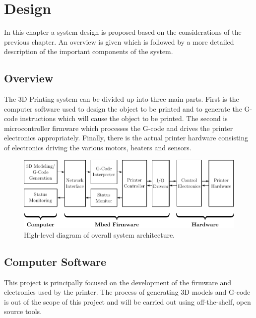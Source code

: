 \chapter{Design}
	
	
	In this chapter a system design is proposed based on the considerations of the
	previous chapter. An overview is given which is followed by a more detailed
	description of the important components of the system.
	
	\section{Overview}
		
		The 3D Printing system can be divided up into three main parts. First is the
		computer software used to design the object to be printed and to generate
		the G-code instructions which will cause the object to be printed. The
		second is microcontroller firmware which processes the G-code and drives the
		printer electronics appropriately. Finally, there is the actual printer
		hardware consisting of electronics driving the various motors, heaters and
		sensors.
		
		\begin{figure}[here]
			\includegraphics[width=1\textwidth]{diagrams/systemDiagramTop.pdf}
			\caption{High-level diagram of overall system architecture.}
			\label{fig:systemDiagramTop}
		\end{figure}
	
	\section{Computer Software}
		
		This project is principally focused on the development of the firmware and
		electronics used by the printer. The process of generating 3D models and
		G-code is out of the scope of this project and will be carried out using
		off-the-shelf, open source tools.
		
